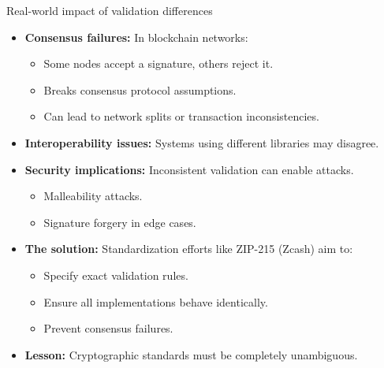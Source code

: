 \documentclass[aspectratio=169, lualatex, handout]{beamer}
\begin{document}
\begin{frame}{Real-world impact of validation differences}
	\begin{itemize}
		\item \textbf{Consensus failures:} In blockchain networks:
		      \begin{itemize}
			      \item Some nodes accept a signature, others reject it.
			      \item Breaks consensus protocol assumptions.
			      \item Can lead to network splits or transaction inconsistencies.
		      \end{itemize}
		\item \textbf{Interoperability issues:} Systems using different libraries may disagree.
		\item \textbf{Security implications:} Inconsistent validation can enable attacks.
		      \begin{itemize}
			      \item Malleability attacks.
			      \item Signature forgery in edge cases.
		      \end{itemize}
		\item \textbf{The solution:} Standardization efforts like ZIP-215 (Zcash) aim to:
		      \begin{itemize}
			      \item Specify exact validation rules.
			      \item Ensure all implementations behave identically.
			      \item Prevent consensus failures.
		      \end{itemize}
		\item \textbf{Lesson:} Cryptographic standards must be completely unambiguous.
	\end{itemize}
\end{frame}
\end{document}
